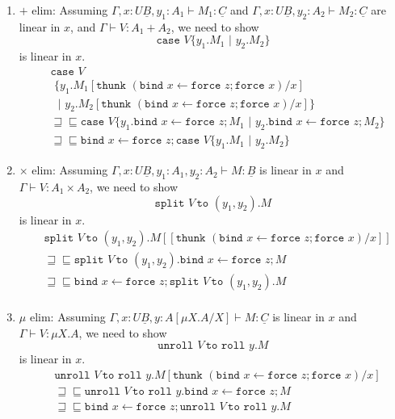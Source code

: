 \documentclass[acmsmall,nonacm]{acmart}
\renewcommand{\u}{\underline}
\newcommand{\pipe}{\,\,|\,\,}
\newcommand{\ltdyn}{\sqsubseteq}
\newcommand{\gtdyn}{\sqsupseteq}
\newcommand{\equidyn}{\mathrel{\gtdyn\ltdyn}}
\newcommand{\roll}{\kw{roll}}
\newcommand{\bindXtoYinZ}[2]{\kw{bind}#2 \leftarrow #1;}
\newcommand{\case}{\kw{case}}
\newcommand{\kw}[1]{\texttt{#1}\,\,}
\newcommand{\caseofXthenYelseZ}[3]{\case #1 \{ #2 \pipe #3 \}}
\newcommand{\caseofX}[1]{\case #1}
\newcommand{\thenY}{\{}
\newcommand{\elseZ}[1]{\pipe #1 \}}
\newcommand{\pmpairWtoXYinZ}[4]{\kw{split} #1\,\kw{to} (#2,#3). #4}
\newcommand{\pmmuXtoYinZ}[3]{\kw{unroll} #1 \,\kw{to} \roll #2. #3}
\newcommand{\thunk}{\kw{thunk}}
\newcommand{\force}{\kw{force}}
\begin{document}
{\begin{longonly}
\begin{longproof}
\begin{enumerate}
  \item $+$ elim: Assuming $\Gamma, x : U\u B, y_1 : A_1 \vdash M_1 :
    \u C$ and $\Gamma, x : U\u B, y_2: A_2\vdash M_2 : \u C$ are
    linear in $x$, and $\Gamma \vdash V : A_1 + A_2$, we need to show
    \[ \caseofXthenYelseZ V {y_1. M_1} {y_2. M_2} \]
    is linear in $x$.
    \begin{align*}
      & \caseofX V\\
      & \,\,\thenY {y_1. M_1[\thunk{(\bindXtoYinZ {\force z} x \force x)}/x]}\\
      & \,\,\elseZ {y_2. M_2[\thunk{(\bindXtoYinZ {\force z} x \force x)}/x]}\\
      &\equidyn \caseofXthenYelseZ V {y_1. \bindXtoYinZ {\force z} x M_1}{y_2. \bindXtoYinZ {\force z} x M_2}\tag{$M_1,M_2$ linear}\\
      &\equidyn
       \bindXtoYinZ {\force z} x \caseofXthenYelseZ V {y_1. M_1}{y_2. M_2}
    \end{align*}
  \item $\times$ elim: Assuming $\Gamma, x:U\u B, y_1 : A_1, y_2 : A_2
    \vdash M : \u B$ is linear in $x$ and $\Gamma \vdash V : A_1
    \times A_2$, we need to show
    \[ \pmpairWtoXYinZ V {y_1}{y_2} M \]
    is linear in $x$.
    \begin{align*}
      &\pmpairWtoXYinZ V {y_1}{y_2} M[[\thunk{(\bindXtoYinZ {\force z} x \force x)}/x]]\\
      &\equidyn \pmpairWtoXYinZ V {y_1}{y_2} \bindXtoYinZ {\force z} x M\tag{$M$ linear}\\
      &\equidyn  \bindXtoYinZ {\force z} x\pmpairWtoXYinZ V {y_1}{y_2} M\tag{comm. conv}\\
    \end{align*}
  \item $\mu$ elim: Assuming $\Gamma , x : U \u B, y : A[\mu X.A/X]
    \vdash M : \u C$ is linear in $x$ and $\Gamma \vdash V : \mu X.A$,
    we need to show
    \[ \pmmuXtoYinZ V y M \]
    is linear in $x$.
    \begin{align*}
      & \pmmuXtoYinZ V y M[\thunk{(\bindXtoYinZ {\force z} x \force x)}/x]\\
      & \equidyn \pmmuXtoYinZ V y \bindXtoYinZ {\force z} x M\tag{$M$ linear}\\
      &\equidyn  \bindXtoYinZ {\force z} x\pmmuXtoYinZ V y M \tag{commuting conversion}
    \end{align*}
  \end{enumerate}
\end{longproof}


\end{longonly}}
\end{document}
